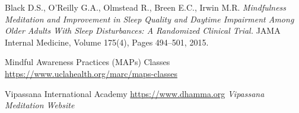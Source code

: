 \documentclass[a4paper, amsfonts, amssymb, amsmath, reprint, showkeys, nofootinbib, twoside]{revtex4-1}
\begin{document}
\begin{thebibliography}{99}
  Black D.S., O’Reilly G.A., Olmstead R., Breen E.C., Irwin M.R.
  \textit{Mindfulness Meditation and Improvement in Sleep Quality and Daytime Impairment
    Among Older Adults With Sleep Disturbances: A Randomized Clinical Trial.}
  JAMA Internal Medicine, Volume 175(4), Pages 494–501, 2015.

  Mindful Awareness Practices (MAPs) Classes
  \url{https://www.uclahealth.org/marc/maps-classes}

  Vipassana International Academy
  \url{https://www.dhamma.org}
  \textit{Vipassana Meditation Website}


\end{thebibliography}
\end{document}
